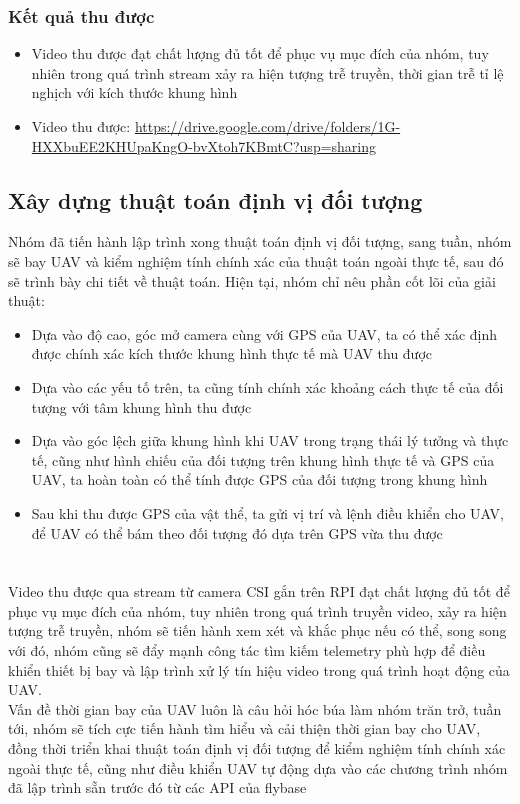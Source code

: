 \documentclass[12pt,a4paper]{report}
\begin{document}
\subsection{Kết quả thu được}
\begin{itemize}
	\item Video thu được đạt chất lượng đủ tốt để phục vụ mục đích của nhóm, tuy nhiên trong quá trình stream xảy ra hiện tượng trễ truyền, thời gian trễ tỉ lệ nghịch với kích thước khung hình
	\item Video thu được: \url {https://drive.google.com/drive/folders/1G-HXXbuEE2KHUpaKngO-bvXtoh7KBmtC?usp=sharing}
\end{itemize}
\section{Xây dựng thuật toán định vị đối tượng}
\hspace{25pt} Nhóm đã tiến hành lập trình xong thuật toán định vị đối tượng, sang tuần, nhóm sẽ bay UAV và kiểm nghiệm tính chính xác của thuật toán ngoài thực tế, sau đó sẽ trình bày chi tiết về thuật toán. Hiện tại, nhóm chỉ nêu phần cốt lõi của giải thuật:
\begin{itemize} 
	\item Dựa vào độ cao, góc mở camera cùng với GPS của UAV, ta có thể xác định được chính xác kích thước khung hình thực tế mà UAV thu được
	\item Dựa vào các yếu tố trên, ta cũng tính chính xác khoảng cách thực tế của đối tượng với tâm khung hình thu được 
	\item Dựa vào góc lệch giữa khung hình khi UAV trong trạng thái lý tưởng và thực tế, cũng như hình chiếu của đối tượng trên khung hình thực tế và GPS của UAV, ta hoàn toàn có thể tính được GPS của đối tượng trong khung hình
	\item Sau khi thu được GPS của vật thể, ta gửi vị trí và lệnh điều khiển cho UAV, để UAV có thể bám theo đối tượng đó dựa trên GPS vừa thu được 
\end{itemize}

\chapter*{}                         %
\hspace{25pt} Video thu được qua stream từ camera CSI gắn trên RPI đạt chất lượng đủ tốt để phục vụ mục đích của nhóm, tuy nhiên trong quá trình truyền video, xảy ra hiện tượng trễ truyền, nhóm sẽ tiến hành xem xét và khắc phục nếu có thể, song song với đó, nhóm cũng sẽ đẩy mạnh công tác tìm kiếm telemetry phù hợp để điều khiển thiết bị bay và lập trình xử lý tín hiệu video trong quá trình hoạt động của UAV.\\
Vấn đề thời gian bay của UAV luôn là câu hỏi hóc búa làm nhóm trăn trở, tuần tới, nhóm sẽ tích cực tiến hành tìm hiểu và cải thiện thời gian bay cho UAV, đồng thời triển khai thuật toán định vị đối tượng để kiểm nghiệm tính chính xác ngoài thực tế, cũng như điều khiển UAV tự động dựa vào các chương trình nhóm đã lập trình sẵn trước đó từ các API của flybase
\end{document}
